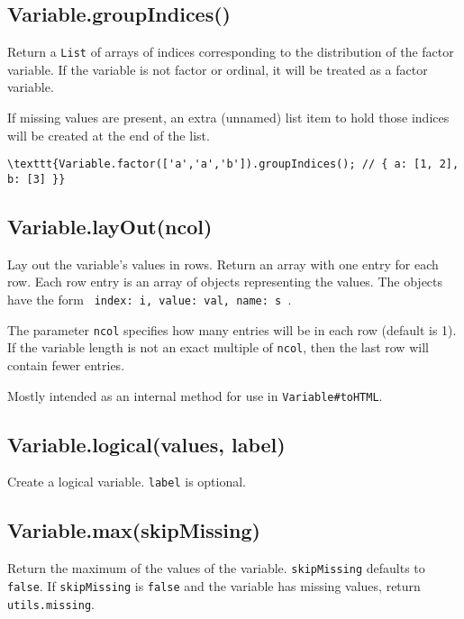 \documentclass{article}
\begin{document}
    \subsection*{Variable.groupIndices()}
    Return a \texttt{List} of arrays of indices corresponding to the distribution
of the factor variable. If the variable is not factor or ordinal, it will
be treated as a factor variable.


If missing values are present, an extra (unnamed) list item to hold those
indices will be created at the end of the list.


\begin{lstlisting}
\texttt{Variable.factor(['a','a','b']).groupIndices(); // { a: [1, 2], b: [3] }}\end{lstlisting}

    \subsection*{Variable.layOut(ncol)}
    Lay out the variable's values in rows. Return an array with one entry for
each row. Each row entry is an array of objects representing the values.
The objects have the form \texttt{{ index: i, value: val, name: s }}.


The parameter \texttt{ncol} specifies how many entries will be in each row (default
is 1). If the variable length is not an exact multiple of \texttt{ncol}, then the
last row will contain fewer entries.


Mostly intended as an internal method for use in \texttt{Variable\#toHTML}.


    \subsection*{Variable.logical(values, label)}
    Create a logical variable. \texttt{label} is optional.


    \subsection*{Variable.max(skipMissing)}
    Return the maximum of the values of the variable.
\texttt{skipMissing} defaults to \texttt{false}.  If \texttt{skipMissing} is \texttt{false} and
the variable has missing values, return \texttt{utils.missing}.
\end{document}
